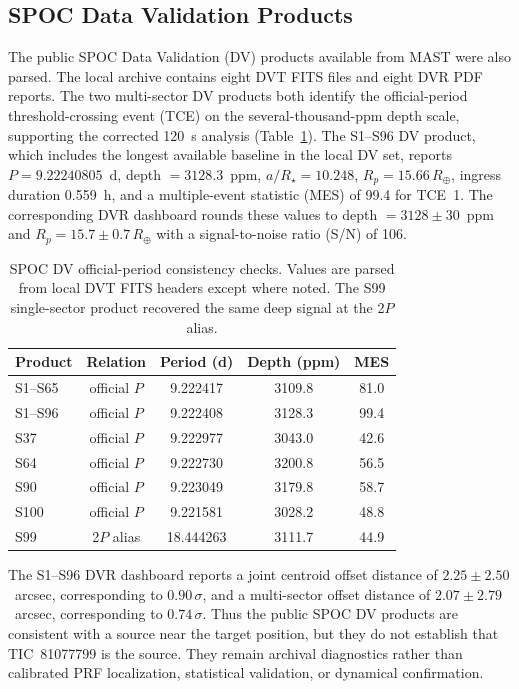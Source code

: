 \documentclass[11pt]{article}
\begin{document}
\subsection{SPOC Data Validation Products}

The public SPOC Data Validation (DV) products available from
MAST were also parsed.  The local archive contains eight DVT FITS files and eight DVR PDF
reports.  The two multi-sector DV products both identify the official-period
threshold-crossing event (TCE) on the several-thousand-ppm depth scale,
supporting the
corrected 120~s analysis (Table~\ref{tab:spocdv}).  The S1--S96 DV product,
which includes the longest available baseline in the local DV set, reports
$P=9.22240805$~d, depth $=3128.3$~ppm, $a/R_\star=10.248$,
$R_p=15.66\,R_\oplus$, ingress duration 0.559~h, and a multiple-event statistic
(MES) of 99.4 for TCE~1.
The corresponding DVR dashboard rounds these values to
depth $=3128\pm30$~ppm and $R_p=15.7\pm0.7\,R_\oplus$ with a signal-to-noise
ratio (S/N) of 106.

\begin{table}[ht]
\centering
\caption{SPOC DV official-period consistency checks.  Values are parsed from
  local DVT FITS headers except where noted.  The S99 single-sector product
  recovered the same deep signal at the 2$P$ alias.}
\label{tab:spocdv}
\begin{tabular}{lcccc}
\toprule
Product & Relation & Period (d) & Depth (ppm) & MES \\
\midrule
S1--S65  & official $P$ & 9.222417 & 3109.8 & 81.0 \\
S1--S96  & official $P$ & 9.222408 & 3128.3 & 99.4 \\
S37      & official $P$ & 9.222977 & 3043.0 & 42.6 \\
S64      & official $P$ & 9.222730 & 3200.8 & 56.5 \\
S90      & official $P$ & 9.223049 & 3179.8 & 58.7 \\
S100     & official $P$ & 9.221581 & 3028.2 & 48.8 \\
S99      & 2$P$ alias   & 18.444263 & 3111.7 & 44.9 \\
\bottomrule
\end{tabular}
\end{table}

The S1--S96 DVR dashboard reports a joint centroid offset distance of
$2.25\pm2.50$~arcsec, corresponding to $0.90\,\sigma$, and a multi-sector
offset distance of $2.07\pm2.79$~arcsec, corresponding to $0.74\,\sigma$.
Thus the public SPOC DV products are consistent with a source near the target
position, but they do not establish that TIC~81077799 is the source.  They
remain archival diagnostics rather than calibrated PRF localization,
statistical validation, or dynamical confirmation.
\end{document}
